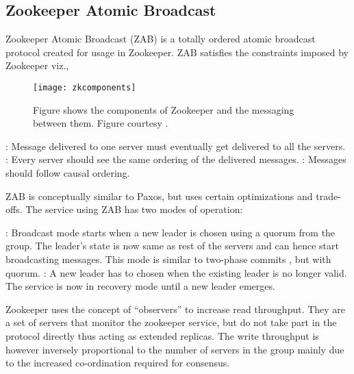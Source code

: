 \subsection{Zookeeper Atomic Broadcast}

Zookeeper Atomic Broadcast (ZAB) 
\citep{Reed:2008:STO:1529974.1529978, JunqueiraRS11} is a 
totally ordered atomic broadcast protocol created for usage in Zookeeper. ZAB
satisfies the constraints imposed by Zookeeper viz.,

\begin{figure}
  \texttt{[image: zkcomponents]}
  \caption[Zookeeper Components]{%
    Figure shows the components of Zookeeper and the messaging between them.
    Figure courtesy \citet{zookeeper}.}
  \label{figure:megastore}
\end{figure}


\begin{itemize}
    : Message delivered to one server must eventually
    get delivered to all the servers.
    : Every server should see the same ordering of the 
    delivered messages.
    : Messages should follow causal%
    ordering.
\end{itemize}

ZAB is conceptually similar to Paxos, but uses certain optimizations and 
trade-offs. The service using ZAB has two modes of operation:

\begin{itemize}
    : Broadcast mode starts when a new leader is chosen
    using a quorum from the group. The leader's state is now same as rest of
    the servers and can hence start broadcasting messages.
    This mode is similar to two-phase commits \citep{Gray78}, but with quorum.
    : A new leader has to chosen when the existing leader 
    is no longer valid. The service is now in recovery mode until a new leader
    emerges.
\end{itemize}

Zookeeper uses the concept of ``observers'' to increase read throughput. They 
are a set of servers that monitor the zookeeper service, but do not take part
in the protocol directly thus acting as extended replicas. The write throughput
is however inversely proportional to the number of servers in the group mainly
due to the increased co-ordination required for consensus.

